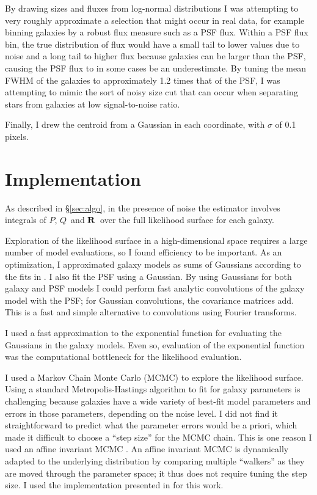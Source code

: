 \documentclass[usegraphicx,usenatbib]{mn2e}
\newcommand{\vecQ}{\mbox{\boldmath $Q$}}
\newcommand{\matR}{\mbox{$\bf R$}}
\begin{document}
By drawing sizes and fluxes from log-normal distributions I was attempting to
very roughly approximate a selection that might occur in real data, for example
binning galaxies by a robust flux measure such as a PSF flux.  Within a PSF
flux bin, the true distribution of flux would have a small tail to lower values
due to noise and a long tail to higher flux because galaxies can be larger than
the PSF, causing the PSF flux to in some cases be an underestimate.  By tuning
the mean FWHM of the galaxies to approximately 1.2 times that of the PSF, I was
attempting to mimic the sort of noisy size cut that can occur when 
separating stars from galaxies at low signal-to-noise ratio.

Finally, I drew the centroid from a Gaussian in each coordinate, with $\sigma$
of 0.1 pixels.  


\section{Implementation} \label{sec:impl}

As described in \S \ref{sec:algo}, in the presence of noise the estimator
involves integrals of $P$, \vecQ\ and \matR\ over the full likelihood surface
for each galaxy.

Exploration of the likelihood surface in a high-dimensional space requires a
large number of model evaluations, so I found efficiency to be important.  As
an optimization, I approximated galaxy models as sums of Gaussians according to
the fits in \citet{HoggGMix}.  I also fit the PSF using a Gaussian.  By using
Gaussians for both galaxy and PSF models I could perform fast analytic
convolutions of the galaxy model with the PSF; for Gaussian convolutions, the
covariance matrices add.  This is a fast and simple alternative to convolutions
using Fourier transforms.

I used a fast approximation to the exponential function for evaluating the
Gaussians in the galaxy models.  Even so, evaluation of the exponential
function was the computational bottleneck for the likelihood evaluation.

I used a Markov Chain Monte Carlo (MCMC) to explore the likelihood surface.
Using a standard Metropolis-Hastings algorithm \citep{Metropolis53}  to fit for
galaxy parameters is challenging because galaxies have a wide variety of
best-fit model parameters and errors in those parameters, depending on the
noise level.  I did not find it straightforward to predict what the parameter
errors would be a priori, which made it difficult to choose a ``step size'' for
the MCMC chain.  This is one reason I used an affine invariant MCMC
\citep{GoodmanWeare10}.  An affine invariant MCMC is dynamically adapted to the
underlying distribution by comparing multiple ``walkers'' as they are moved
through the parameter space; it thus does not require tuning the step size.  I
used the implementation presented in \citet{Mackey13} for this work.
\end{document}
